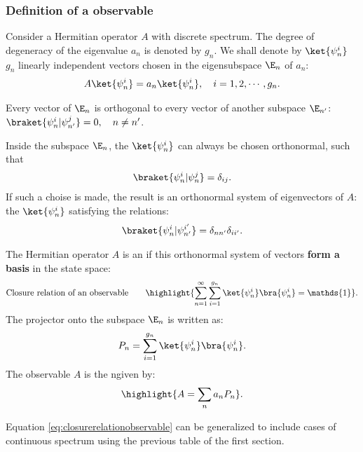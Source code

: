 \subsubsection{Definition of a observable}
Consider a Hermitian operator $A$ with discrete spectrum. The degree of degeneracy of the eigenvalue $a_n$ is denoted by $g_n$. We shall denote
by $\ket{\psi_n^i}$ $g_n$ linearly independent vectors chosen in the eigensubspace $\E_n$ of $a_n$:
\begin{align}
    A\ket{\psi_n^i}=a_n\ket{\psi_n^i},\quad i=1,2,\cdots,g_n.
\end{align}

Every vector of $\E_n$ is orthogonal to every vector of another subspace $\E_{n'}$: $\braket{\psi_n^i|\psi_{n'}^j}=0,\quad n\neq n'$.

Inside the subspace $\E_n$, the $\ket{\psi_n^i}$ can always be chosen orthonormal, such that
\begin{align}
    \braket{\psi_n^i|\psi_n^j}=\delta_{ij}.
\end{align}
If such a choise is made, the result is an orthonormal system of eigenvectors of $A$: the $\ket{\psi_n^i}$ satisfying the relations:
\begin{align}
    \braket{\psi_n^i|\psi_{n'}^{i'}}=\delta_{nn'}\delta_{ii'}.
\end{align}

\begin{definition}[Observable]
    The Hermitian operator $A$ is an  if this orthonormal system of vectors \textbf{form a basis} in the state space:
    \begin{align}
        \text{Closure relation of an observable}\qquad\highlight{\sum_{n=1}^\infty\sum_{i=1}^{g_n}\ket{\psi_n^i}\bra{\psi_n^i}=\mathds{1}}.
        \label{eq:closurerelationobservable}
    \end{align}
    The projector onto the subspace $\E_n$ is written as:
    \begin{align}
        P_n=\sum_{i=1}^{g_n}\ket{\psi_n^i}\bra{\psi_n^i}.
    \end{align}
    The observable $A$ is the ngiven by:
    \begin{align}
        \highlight{A=\sum_na_nP_n}.
    \end{align}
\end{definition}

Equation \eqref{eq:closurerelationobservable} can be generalized to include cases of continuous spectrum using the previous table of the first section.

